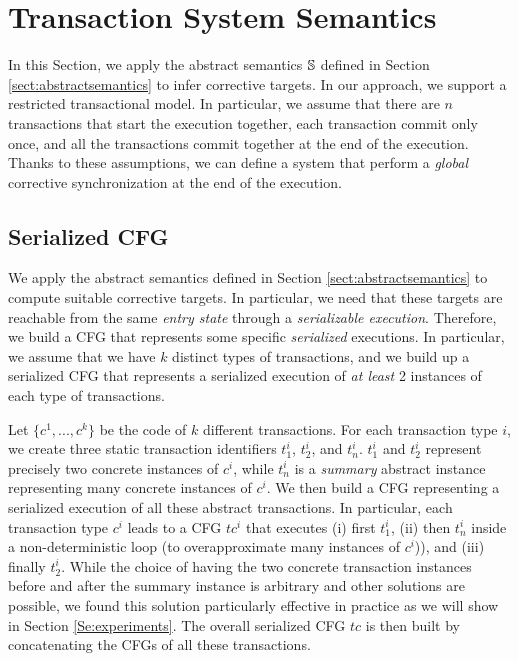 \section{Transaction System Semantics}
\label{sec:transactionsystemwarping}
In this Section, we apply the abstract semantics $\mathbb{S}$ defined in Section \ref{sect:abstractsemantics} to infer corrective targets.
%
In our approach, we support a restricted transactional model. In particular, we assume that there are $n$ transactions that start the execution together, each transaction commit only once, and all the transactions commit together at the end of the execution. Thanks to these assumptions, we can define a system that perform a \emph{global} corrective synchronization at the end of the execution.


\subsection{Serialized CFG}
\label{Se:concabs}
We apply the abstract semantics defined in Section \ref{sect:abstractsemantics} to compute suitable corrective targets. In particular, we need that these targets are reachable from the same \emph{entry state} through a \emph{serializable execution}. Therefore, we build a CFG that represents some specific \emph{serialized} executions. In particular, we assume that we have $k$ distinct types of transactions, and we build up a serialized CFG that represents a serialized execution of \emph{at least} 2 instances of each type of transactions.

Let $\{c^1, ..., c^k\}$ be the code of $k$ different transactions. For each transaction type $i$, we create three static transaction identifiers $t^i_1$, $t^i_2$, and $t^i_n$. $t^i_1$ and $t^i_2$ represent precisely two concrete instances of $c^i$, while $t^i_n$ is a \emph{summary} abstract instance representing many concrete instances of $c^i$. We then build a CFG representing a serialized execution of all these abstract transactions. In particular, each transaction type $c^i$ leads to a CFG $tc^i$ that executes (i) first $t^i_1$, (ii) then $t^i_n$ inside a non-deterministic loop (to overapproximate many instances of $c^i$)), and (iii) finally $t^i_2$. While the choice of having the two concrete transaction instances before and after the summary instance is arbitrary and other solutions are possible, we found this solution particularly effective in practice as we will show in Section \ref{Se:experiments}. The overall serialized CFG $tc$ is then built by concatenating the CFGs of all these transactions.

